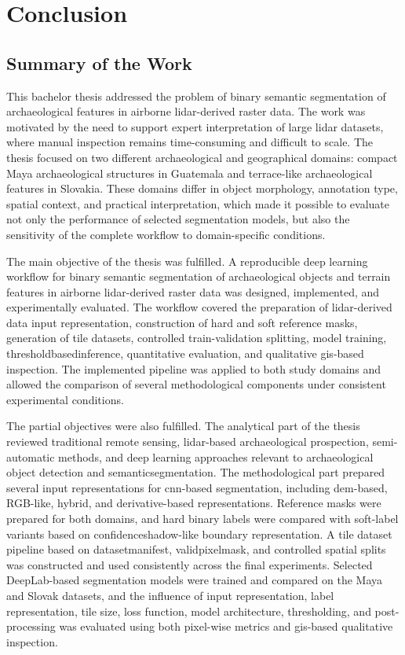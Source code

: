 
\chapter{Conclusion}\label{ch:conclusion}

\section{Summary of the Work}

This bachelor thesis addressed the problem of binary semantic segmentation of archaeological features in airborne \gls{lidar}-derived raster data. The work was motivated by the need to support expert interpretation of large \gls{lidar} datasets, where manual inspection remains time-consuming and difficult to scale. The thesis focused on two different archaeological and geographical domains: compact Maya archaeological structures in Guatemala and terrace-like archaeological features in Slovakia. These domains differ in object morphology, annotation type, spatial context, and practical interpretation, which made it possible to evaluate not only the performance of selected segmentation models, but also the sensitivity of the complete workflow to domain-specific conditions.

The main objective of the thesis was fulfilled. A reproducible deep learning workflow for binary semantic segmentation of archaeological objects and terrain features in airborne \gls{lidar}-derived raster data was designed, implemented, and experimentally evaluated. The workflow covered the preparation of \gls{lidar}-derived data input representation, construction of hard and soft reference masks, generation of tile datasets, controlled train-validation splitting, model training, \gls{thresholdbasedinference}, quantitative evaluation, and qualitative \gls{gis}-based inspection. The implemented pipeline was applied to both study domains and allowed the comparison of several methodological components under consistent experimental conditions.

The partial objectives were also fulfilled. The analytical part of the thesis reviewed traditional remote sensing, \gls{lidar}-based archaeological prospection, semi-automatic methods, and deep learning approaches relevant to archaeological object detection and \gls{semanticsegmentation}. The methodological part prepared several input representations for \gls{cnn}-based segmentation, including \gls{dem}-based, RGB-like, hybrid, and derivative-based representations. Reference masks were prepared for both domains, and hard binary labels were compared with soft-label variants based on \gls{confidenceshadow}-like boundary representation. A tile dataset pipeline based on \gls{datasetmanifest}, \gls{validpixelmask}, and controlled spatial splits was constructed and used consistently across the final experiments. Selected DeepLab-based segmentation models were trained and compared on the Maya and Slovak datasets, and the influence of input representation, label representation, tile size, loss function, model architecture, thresholding, and post-processing was evaluated using both pixel-wise metrics and \gls{gis}-based qualitative inspection.

